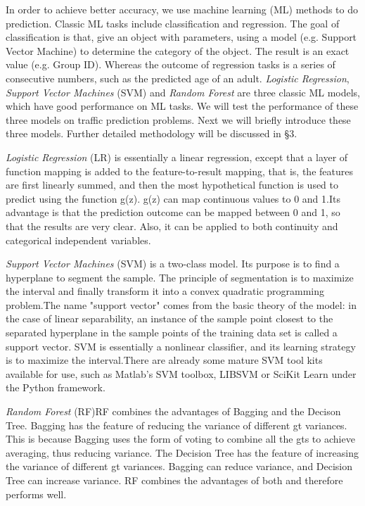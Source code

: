 In order to achieve better accuracy, we use machine learning (ML) methods to do
prediction. Classic ML tasks include classification and regression. The goal of
classification is that, give an object with parameters, using a model (e.g.
Support Vector Machine) to determine the category of the object. The result is
an exact value (e.g. Group ID). Whereas the outcome of regression tasks is a
series of consecutive numbers, such as the predicted age of an adult.
\textit{Logistic Regression}, \textit{Support Vector Machines} (SVM) and
\textit{Random Forest} are three classic ML models, which have good performance
on ML tasks. We will test the performance of these three models on traffic
prediction problems. Next we will briefly introduce these three models. Further
detailed methodology will be discussed in \S 3.

\textit{Logistic Regression} (LR) is essentially a linear regression, except
that a layer of function mapping is added to the feature-to-result mapping, that
is, the features are first linearly summed, and then the most hypothetical
function is used to predict using the function g(z). g(z) can map continuous
values to 0 and 1.Its advantage is that the prediction outcome can be mapped
between 0 and 1, so that the results are very clear. Also, it can be applied to
both continuity and categorical independent variables.

\textit{Support Vector Machines} (SVM) is a two-class model. Its purpose is to
find a hyperplane to segment the sample. The principle of segmentation is to
maximize the interval and finally transform it into a convex quadratic
programming problem.The name "support vector" comes from the basic theory of the
model: in the case of linear separability, an instance of the sample point
closest to the separated hyperplane in the sample points of the training data
set is called a support vector. SVM is essentially a nonlinear classifier, and
its learning strategy is to maximize the interval.There are already some mature
SVM tool kits available for use, such as Matlab's SVM toolbox, LIBSVM or SciKit
Learn under the Python framework.

\textit{Random Forest} (RF)RF combines the advantages of Bagging and the Decison
Tree. Bagging has the feature of reducing the variance of different gt
variances. This is because Bagging uses the form of voting to combine all the
gts to achieve averaging, thus reducing variance. The Decision Tree has the
feature of increasing the variance of different gt variances. Bagging can reduce
variance, and Decision Tree can increase variance. RF combines the advantages of
both and therefore performs well.

